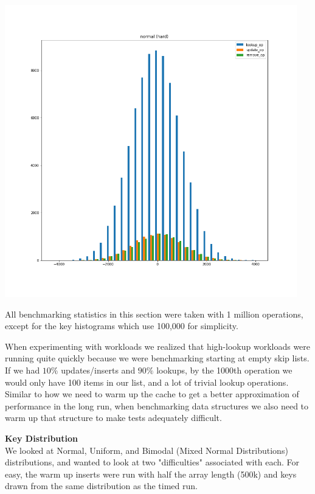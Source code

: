 \documentclass[11pt]{article}
\begin{document}
\includegraphics[width=5in]{normal_hard_byop.png}

All benchmarking statistics in this section were taken with 1 million operations, except for the key histograms which use 100,000 for simplicity.

When experimenting with workloads we realized that high-lookup workloads were running quite quickly because we were benchmarking starting at empty skip lists. If we had $10\%$ updates/inserts and $90\%$ lookups, by the 1000th operation we would only have 100 items in our list, and a lot of trivial lookup operations.
Similar to how we need to warm up the cache to get a better approximation of performance in the long run, when benchmarking data structures we also need to warm up that structure to make tests adequately difficult.

\textbf{Key Distribution} \\
We looked at Normal, Uniform, and Bimodal (Mixed Normal Distributions) distributions, and wanted to look at two "difficulties" associated with each. For easy, the warm up inserts were run with half the array length (500k) and keys drawn from the same distribution as the timed run. 
\end{document}
